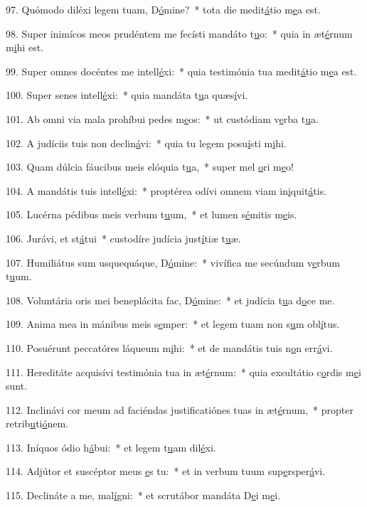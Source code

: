 97. Quómodo diléxi legem tuam, D\uline{ó}mine?~* tota die medit\uline{á}tio m\uline{e}a est.\par 
98. Super inimícos meos prudéntem me fecísti mandáto t\uline{u}o:~* quia in æt\uline{é}rnum m\uline{i}hi est.\par 
99. Super omnes docéntes me intell\uline{é}xi:~* quia testimónia tua medit\uline{á}tio m\uline{e}a est.\par 
100. Super senes intell\uline{é}xi:~* quia mandáta t\uline{u}a quæs\uline{í}vi.\par 
101. Ab omni via mala prohíbui pedes m\uline{e}os:~* ut custódiam v\uline{e}rba t\uline{u}a.\par 
102. A judíciis tuis non declin\uline{á}vi:~* quia tu legem posu\uline{í}sti m\uline{i}hi.\par 
103. Quam dúlcia fáucibus meis elóquia t\uline{u}a,~* super mel \uline{o}ri m\uline{e}o!\par 
104. A mandátis tuis intell\uline{é}xi:~* proptérea odívi omnem viam in\uline{i}quit\uline{á}tis.\par 
105. Lucérna pédibus meis verbum t\uline{u}um,~* et lumen s\uline{é}mitis m\uline{e}is.\par 
106. Jurávi, et st\uline{á}tui~* custodíre judícia just\uline{í}tiæ t\uline{u}æ.\par 
107. Humiliátus sum usquequáque, D\uline{ó}mine:~* vivífica me secúndum v\uline{e}rbum t\uline{u}um.\par 
108. Voluntária oris mei beneplácita fac, D\uline{ó}mine:~* et judícia t\uline{u}a d\uline{o}ce me.\par 
109. Anima mea in mánibus meis s\uline{e}mper:~* et legem tuam non s\uline{u}m obl\uline{í}tus.\par 
110. Posuérunt peccatóres láqueum m\uline{i}hi:~* et de mandátis tuis n\uline{o}n err\uline{á}vi.\par 
111. Hereditáte acquisívi testimónia tua in æt\uline{é}rnum:~* quia exsultátio c\uline{o}rdis m\uline{e}i sunt.\par 
112. Inclinávi cor meum ad faciéndas justificatiónes tuas in æt\uline{é}rnum,~* propter retrib\uline{u}ti\uline{ó}nem.\par 
113. Iníquos ódio h\uline{á}bui:~* et legem t\uline{u}am dil\uline{é}xi.\par 
114. Adjútor et suscéptor meus \uline{e}s tu:~* et in verbum tuum sup\uline{e}rsper\uline{á}vi.\par 
115. Declináte a me, mal\uline{í}gni:~* et scrutábor mandáta D\uline{e}i m\uline{e}i.\par 
